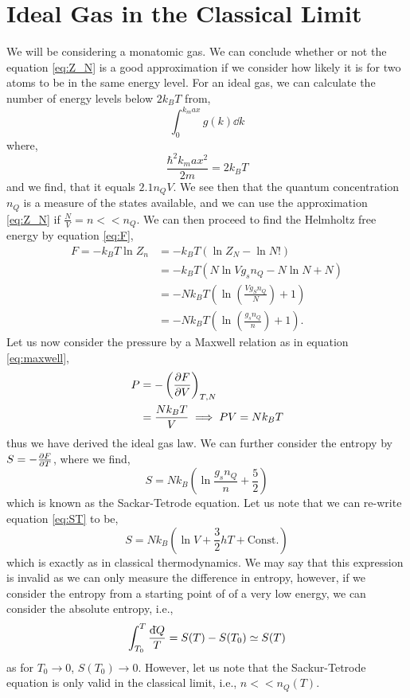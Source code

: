 \documentclass{book}
\newcommand{\dbar}{\mathrm{d}\hspace*{-0.08em}\bar{}\hspace*{0.1em}}
\begin{document}
\section{Ideal Gas in the Classical Limit}
We will be considering a monatomic gas. We can conclude whether or not the equation \eqref{eq:Z_N} is a good approximation if we consider how likely it is for two atoms to be in the same energy level. For an ideal gas, we can calculate the number of energy levels below $2k_BT$ from,
\begin{equation}
	\int_0^{k_max} g(k)\dd{k}
\end{equation}
where,
\begin{equation}
	\frac{\hbar^2k_max^2}{2m} = 2k_BT
\end{equation}
and we find, that it equals $2.1n_QV$. We see then that the quantum concentration $n_Q$ is a measure of the states available, and we can use the approximation \eqref{eq:Z_N} if $\frac{N}{V} = n << n_Q$. We can then proceed to find the Helmholtz free energy by equation \eqref{eq:F},
\begin{equation}
	\begin{split}
		F = -k_BT\ln Z_n & = - k_BT(\ln Z_N - \ln N!) \\
		& = -k_BT\left(N \ln Vg_s n_Q - N\ln N + N\right) \\
		& = -Nk_BT \left(\ln\left(\frac{Vg_Sn_Q}{N}\right)+1\right) \\
		& = -Nk_BT\left(\ln\left(\frac{g_sn_Q}{n}\right) + 1\right).
	\end{split}
\end{equation}
Let us now consider the pressure by a Maxwell relation as in equation \eqref{eq:maxwell},
\begin{equation}
	\begin{split}
	P &= -\left(\pdv{F}{V}\right)_{T,N} \\
	& = \frac{Nk_BT}{V} \implies PV = Nk_BT
	\end{split}
\end{equation}
thus we have derived the ideal gas law. We can further consider the entropy by $S = -\pdv{F}{T}$, where we find,
\begin{equation}
	\boxed{S = Nk_B\left(\ln\frac{g_sn_Q}{n} + \frac{5}{2}\right)}\label{eq:ST}
\end{equation}
which is known as the Sackar-Tetrode equation. Let us note that we can re-write equation \eqref{eq:ST} to be,
\begin{equation}
	S = Nk_B\left(\ln V + \frac{3}{2}hT + \text{Const.}\right)
\end{equation}
which is exactly as in classical thermodynamics. We may say that this expression is invalid as we can only measure the difference in entropy, however, if we consider the entropy from a starting point of of a very low energy, we can consider the absolute entropy, i.e.,
\begin{equation}
	\int_{T_0}^T\frac{\dbar Q}{T} = S(T) - S(T_0) \simeq S(T)
\end{equation}
as for $T_0 \to 0$, $S(T_0) \to 0$. However, let us note that the Sackur-Tetrode equation is only valid in the classical limit, i.e., $n << n_Q(T)$. 
\end{document}
